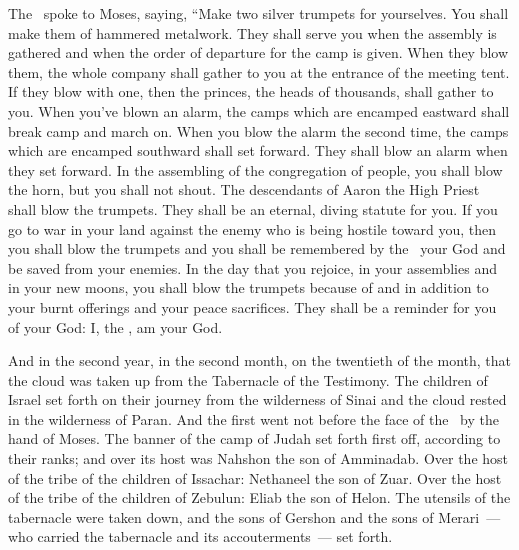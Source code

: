 
\begin{inparaenum}
   The \lord\ spoke to Moses, saying,%
   ``Make two silver trumpets for yourselves. You shall make them of hammered metalwork. They shall serve you when the assembly is gathered and when the order of departure for the camp is given.%
   When they blow them, the whole company shall gather to you at the entrance of the meeting tent.%
   If they blow with one, then the princes, the heads of thousands, shall gather to you.%
   When you've blown an alarm, the camps which are encamped eastward shall break camp and march on.%
   When you blow the alarm the second time, the camps which are encamped southward shall set forward. They shall blow an alarm when they set forward.%
   In the assembling of the congregation of people, you shall blow the horn, but you shall not shout.%
   The descendants of Aaron the High Priest shall blow the trumpets. They shall be an eternal, diving statute for you.%
   If you go to war in your land against the enemy who is being hostile toward you, then you shall blow the trumpets and you shall be remembered by the \lord\ your God and be saved from your enemies.%
   In the day that you rejoice, in your assemblies and in your new moons, you shall blow the trumpets because of and in addition to your burnt offerings and your peace sacrifices. They shall be a reminder for you of your God: I, the \lord, am your God.%

   And in the second year, in the second month, on the twentieth of the month, that the cloud was taken up from the Tabernacle of the Testimony.%
   The children of Israel set forth on their journey from the wilderness of Sinai and the cloud rested in the wilderness of Paran.%
   And the first went not before the face of the \lord\ by the hand of Moses.%
   The banner of the camp of Judah set forth first off, according to their ranks; and over its host was Nahshon the son of Amminadab.%
   Over the host of the tribe of the children of Issachar: Nethaneel the son of Zuar.%
   Over the host of the tribe of the children of Zebulun: Eliab the son of Helon.%
   The utensils of the tabernacle were taken down, and the sons of Gershon and the sons of Merari~--- who carried the tabernacle and its accouterments~--- set forth.%


\end{inparaenum}
